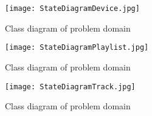 \begin{figure}
  \centering
  \texttt{[image: StateDiagramDevice.jpg]}
  \caption{Class diagram of problem domain}\label{fig:StateDiagramDevice}
\end{figure}

\begin{figure}
  \centering
  \texttt{[image: StateDiagramPlaylist.jpg]}
  \caption{Class diagram of problem domain}\label{fig:StateDiagramPlaylist}
\end{figure}

\begin{figure}
  \centering
  \texttt{[image: StateDiagramTrack.jpg]}
  \caption{Class diagram of problem domain}\label{fig:StateDiagramTrack}
\end{figure}